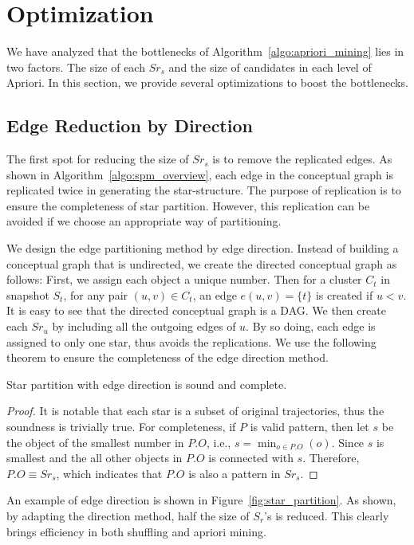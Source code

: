 \section{Optimization}
We have analyzed that the bottlenecks of Algorithm~\ref{algo:apriori_mining} 
lies in two factors. The size of each $Sr_s$ and the size of candidates in each level of Apriori.
In this section, we provide several optimizations to boost the bottlenecks.

\subsection{Edge Reduction by Direction}
The first spot for reducing the size of $Sr_s$ is to remove the replicated edges. As shown in Algorithm~\ref{algo:spm_overview}, each edge in the conceptual graph is replicated twice in generating the star-structure. The purpose of replication is to ensure the completeness of star partition. However, this replication can be avoided if we choose an appropriate way of partitioning. 

We design the edge partitioning method by edge direction. Instead of building a conceptual graph that is undirected, we create the directed conceptual graph as follows: First, we assign each object a unique number. Then
for a cluster $C_t$ in snapshot $S_t$, for any pair $(u,v) \in C_t$, an edge $e(u,v) = \{t\}$ is created if $u < v$. It is easy to see that the directed conceptual graph is a DAG. We then create each $Sr_u$ by including all the outgoing edges of $u$. By so doing, each edge is assigned to only one star, thus avoids the replications. We use the following theorem to ensure the completeness of the edge direction method.

\begin{theorem}
Star partition with edge direction is sound and complete.
\end{theorem}
\begin{proof}
It is notable that each star is a subset of original trajectories, thus the soundness is trivially true. For completeness, if $P$ is valid pattern, then let $s$ be the object of the smallest number in $P.O$, i.e., $s=\min_{o \in P.O}(o)$. Since $s$ is smallest and the all other objects in $P.O$ is connected with $s$. Therefore, $P.O \equiv Sr_s$, which indicates that $P.O$ is also a pattern in $Sr_s$.
\end{proof}
An example of edge direction is shown in Figure~\ref{fig:star_partition}. As shown,
by adapting the direction method, half the size of $S_r$'s is reduced. This clearly brings efficiency in both shuffling and apriori mining.

